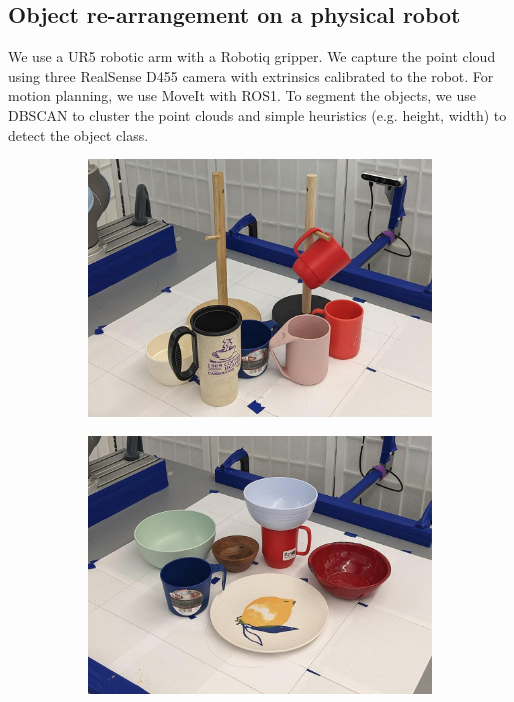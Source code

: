 \documentclass{article}
\begin{document}
\subsection{Object re-arrangement on a physical robot}
\label{appendix:experiment:rearrangement}

We use a UR5 robotic arm with a Robotiq gripper. We capture the point cloud using three RealSense D455 camera with extrinsics calibrated to the robot. For motion planning, we use MoveIt with ROS1. To segment the objects, we use DBSCAN to cluster the point clouds and simple heuristics (e.g. height, width) to detect the object class.

\begin{figure}[]
    \centering

    \begin{subfigure}{(\linewidth - 0.05\linewidth)/3}
        \centering
        \includegraphics[width=\linewidth]{figures/object_sets/mug_on_tree.jpg}
        \caption{}
    \end{subfigure}
    \begin{subfigure}{(\linewidth - 0.05\linewidth)/3}
        \centering
        \includegraphics[width=\linewidth]{figures/object_sets/bowl_on_mug.jpg}

\end{subfigure}
\end{figure}
\end{document}
